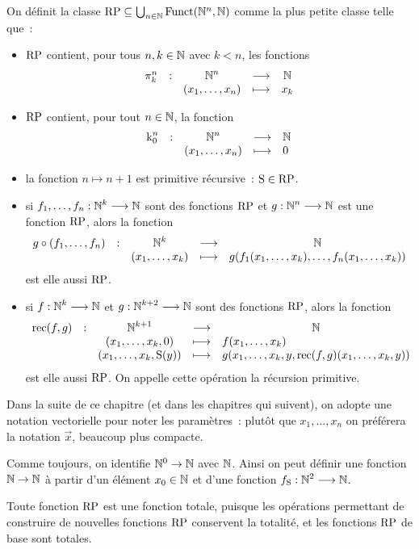 \begin{definition}
  On définit la classe
  $\operatorname{RP}\subseteq \bigcup_{n \in \mathbb N}\operatorname{Funct}(\mathbb N^n,\mathbb N)$
  comme la plus petite classe telle que~:
  \begin{itemize}
  \item $\operatorname{RP}$ contient, pour tous $n,k \in \mathbb N$ avec $k < n$, les fonctions
    \[\makeFun{\projP{k}{n}}{\bN^n}{\bN}{(x_1,\ldots,x_n)}{x_k}\]
  \item $\operatorname{RP}$ contient, pour tout $n \in \mathbb N$, la fonction
    \[\makeFun{\csKZ{n}}{\bN^n}{\bN}{(x_1,\ldots,x_n)}{0}\]
  \item la fonction $n \mapsto n + 1$ est primitive récursive~: $\operatorname{S}\in\operatorname{RP}$.
  \item si $f_1,\ldots,f_n : \displaystyle \mathbb N^k \longrightarrow \mathbb N$ sont des fonctions $\operatorname{RP}$
    et $g : \displaystyle \mathbb N^n \longrightarrow \mathbb N$ est une fonction $\operatorname{RP}$, alors la fonction
    \[\makeFun{g\circ(f_1,\ldots,f_n)}{\bN^k}{\bN}
              {(x_1,\ldots,x_k)}
              {g(f_1(x_1,\ldots,x_k),\ldots,f_n(x_1,\ldots,x_k))}\]
    est elle aussi $\operatorname{RP}$.
  \item si $f : \displaystyle \mathbb N^k \longrightarrow \mathbb N$ et $g : \displaystyle \mathbb N^{k+2} \longrightarrow \mathbb N$
    sont des fonctions $\operatorname{RP}$, alors la fonction
    \[\makeFunBis{\rec(f,g)}{\bN^{k+1}}{\bN}
                 {(x_1,\ldots,x_k,0)}{f(x_1,\ldots,x_k)}
                 {(x_1,\ldots,x_k,\Ss(y))}
                 {g(x_1,\ldots,x_k,y,\rec(f,g)(x_1,\ldots,x_k,y))}\]
    est elle aussi $\operatorname{RP}$. On appelle cette opération la récursion primitive.
  \end{itemize}
\end{definition}

\begin{notation}
  Dans la suite de ce chapitre (et dans les chapitres qui suivent), on adopte
  une notation vectorielle pour noter les paramètres~: plutôt que
  $x_1,\ldots,x_n$ on préférera la notation $\vec x$, beaucoup plus compacte.
\end{notation}

\begin{remark}
  Comme toujours, on identifie $\mathbb N^0 \to \mathbb N$ avec $\mathbb N$. Ainsi on peut définir
  une fonction $\mathbb N \to \mathbb N$ à partir d'un élément $x_0 \in \mathbb N$ et d'une
  fonction $f_{\operatorname{S}} : \displaystyle \mathbb N^2 \longrightarrow \mathbb N$.
\end{remark}

\begin{remark}
  Toute fonction $\operatorname{RP}$ est une fonction totale, puisque les opérations
  permettant de construire de nouvelles fonctions $\operatorname{RP}$ conservent la
  totalité, et les fonctions $\operatorname{RP}$ de base sont totales.
\end{remark}

